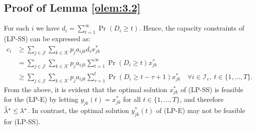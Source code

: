 \documentclass[letterpaper, 10 pt, conference]{ieeeconf}  %
\makeatletter
\renewenvironment{proof}[1][\relax]{\par
  \pushQED{\qed}%
  \normalfont \topsep6\p@\@plus6\p@\relax
  \trivlist
  \item[\hskip\labelsep\itshape
    \ifx#1\relax \proofname\else\proofname{} of #1\fi\@addpunct{.}]\ignorespaces
}{%
  \popQED\endtrivlist\@endpefalse
}
\newcommand{\III}{\mathcal{I}}
\newcommand{\JJJ}{\mathcal{J}}
\newcommand{\KKK}{\mathcal{K}}
\theoremstyle{plain}
\theoremstyle{definition}
\theoremstyle{remark}
\makeatother
\begin{document}
\subsection{Proof of Lemma \ref{olem:3.2}}
\begin{proof}
For each $i$ we have $d_i=\sum^{\infty}_{t=1} \Pr( D_i \geq t)$. Hence, the capacity constraints of (LP-SS) can be expressed as:
\begin{subequations}
\begin{alignat}{2}
c_i & \geq \sum_{j\in \JJJ}\sum_{k\in \KKK} p_j a_{ijk} d_i x^*_{jk} \nonumber \\
& = \sum_{j\in \JJJ} \sum_{k\in \KKK} p_j a_{ijk} \sum^{\infty}_{t=1} \Pr( D_i \geq t) x^*_{jk} \nonumber \\
& \geq \sum_{j\in \JJJ} \sum_{k\in \KKK} p_j a_{ijk} \sum^{t}_{\tau=1} \Pr( D_i \geq t-\tau+1) x^*_{jk}
\quad \forall i\in \III_c,~ t\in \{1, \ldots, T\}. \nonumber
\end{alignat}
\end{subequations}
From the above, it is evident that the optimal solution $x^*_{jk}$ of (LP-SS) is feasible for the (LP-E) by letting $y_{jk}(t)=x^*_{jk}$ for all $t \in \{1,\ldots,T\}$, and therefore $\Tilde{\lambda}^* \leq \lambda^*$. In contrast, the optimal solution $y^*_{jk}(t)$ of (LP-E) may not be feasible for (LP-SS).


\end{proof}
\end{document}
